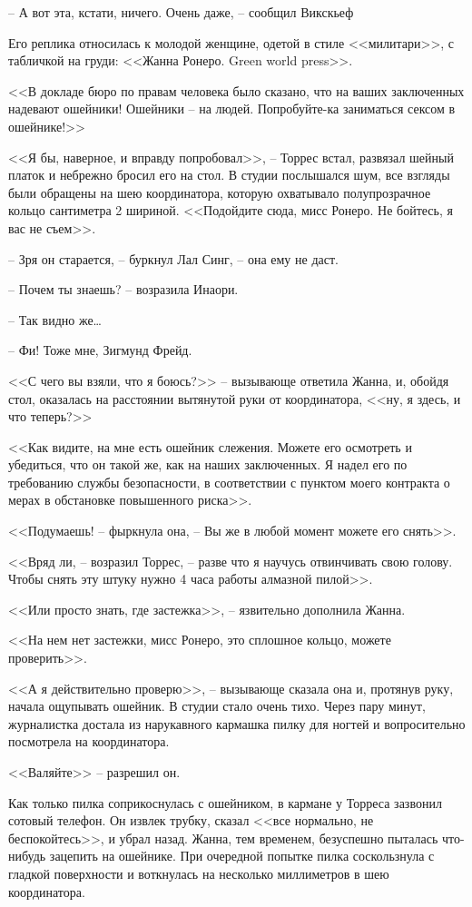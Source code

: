 -- А вот эта, кстати, ничего. Очень даже, -- сообщил Викскьеф

Его реплика относилась к молодой женщине, одетой в стиле <<милитари>>, с табличкой на груди: <<Жанна Ронеро. Green world press>>.

<<В докладе бюро по правам человека было сказано, что на ваших заключенных надевают ошейники! Ошейники -- на людей. Попробуйте-ка заниматься сексом в ошейнике!>>

<<Я бы, наверное, и вправду попробовал>>, -- Торрес встал, развязал шейный платок и небрежно бросил его на стол. В студии послышался шум, все взгляды были обращены на шею координатора, которую охватывало полупрозрачное кольцо сантиметра 2 шириной. <<Подойдите сюда, мисс Ронеро. Не бойтесь, я вас не съем>>.

-- Зря он старается, -- буркнул Лал Синг, -- она ему не даст.

-- Почем ты знаешь? -- возразила Инаори.

-- Так видно же\ldots{}

-- Фи! Тоже мне, Зигмунд Фрейд.

<<С чего вы взяли, что я боюсь?>> -- вызывающе ответила Жанна, и, обойдя стол, оказалась на расстоянии вытянутой руки от координатора, <<ну, я здесь, и что теперь?>>

<<Как видите, на мне есть ошейник слежения. Можете его осмотреть и убедиться, что он такой же, как на наших заключенных. Я надел его по требованию службы безопасности, в соответствии с пунктом моего контракта о мерах в обстановке повышенного риска>>.

<<Подумаешь! -- фыркнула она, -- Вы же в любой момент можете его снять>>.

<<Вряд ли, -- возразил Торрес, -- разве что я научусь отвинчивать свою голову. Чтобы снять эту штуку нужно 4 часа работы алмазной пилой>>.

<<Или просто знать, где застежка>>, -- язвительно дополнила Жанна.

<<На нем нет застежки, мисс Ронеро, это сплошное кольцо, можете проверить>>.

<<А я действительно проверю>>, -- вызывающе сказала она и, протянув руку, начала ощупывать ошейник. В студии стало очень тихо. Через пару минут, журналистка достала из нарукавного кармашка пилку для ногтей и вопросительно посмотрела на координатора.

<<Валяйте>> -- разрешил он.

Как только пилка соприкоснулась с ошейником, в кармане у Торреса зазвонил сотовый телефон. Он извлек трубку, сказал <<все нормально, не беспокойтесь>>, и убрал назад. Жанна, тем временем, безуспешно пыталась что-нибудь зацепить на ошейнике. При очередной попытке пилка соскользнула с гладкой поверхности и воткнулась на несколько миллиметров в шею координатора.

